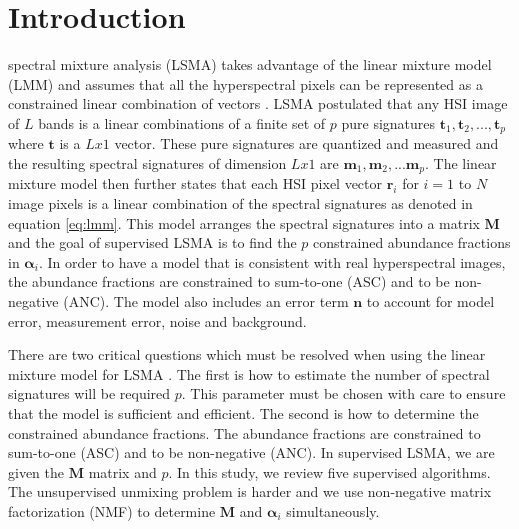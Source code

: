 \documentclass[journal]{IEEEtran}
\begin{document}
\section{Introduction}
 spectral mixture analysis (LSMA) takes advantage of the linear mixture model (LMM) and assumes that all the hyperspectral pixels can be represented as a constrained linear combination of vectors \cite{changbook1}. LSMA postulated that any HSI image of \(L\) bands is a linear combinations of a finite set of \(p\) pure signatures \(\mathbf{t}_1, \mathbf{t}_2, ..., \mathbf{t}_p\) where \(\mathbf{t}\) is a \(Lx1\) vector. These pure signatures are quantized and measured and the resulting spectral signatures of dimension \(Lx1\) are \(\mathbf{m}_1, \mathbf{m}_2, ...\mathbf{m}_p\). The linear mixture model then further states that each HSI pixel vector \(\mathbf{r}_i\) for \(i=1\) to \(N\) image pixels is a linear combination of the spectral signatures as denoted in equation \ref{eq:lmm}. This model arranges the spectral signatures into a matrix \(\mathbf{M}\) and the goal of supervised LSMA is to find the \(p\) constrained abundance fractions in \(\mathbf{\alpha}_i\). In order to have a model that is consistent with real hyperspectral images, the abundance fractions are constrained to sum-to-one (ASC) and to be non-negative (ANC). The model also includes an error term \(\mathbf{n}\) to account for model error, measurement error, noise and background.

There are two critical questions which must be resolved when using the linear mixture model for LSMA \cite{changbook3}. The first is how to estimate the number of spectral signatures will be required \(p\). This parameter must be chosen with care to ensure that the model is sufficient and efficient. The second is how to determine the constrained abundance fractions. The abundance fractions are constrained to sum-to-one (ASC) and to be non-negative (ANC). In supervised LSMA, we are given the \(\mathbf{M}\) matrix and \(p\). In this study, we review five supervised algorithms. The unsupervised unmixing problem is harder and we use non-negative matrix factorization (NMF) to determine \(\mathbf{M}\) and \(\mathbf{\alpha}_i\) simultaneously.
\end{document}
